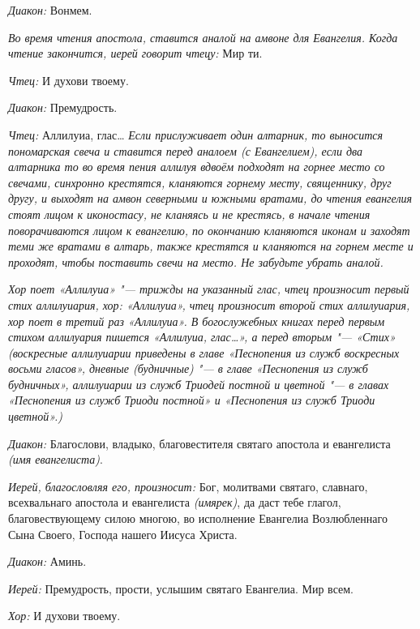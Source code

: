 \begin{mymulticols}
{\itshape Диакон:} Вонмем.


{\itshape Во время чтения апостола, ставится аналой на амвоне для Евангелия. Когда чтение закончится, иерей говорит чтецу:} Мир ти.


 {\itshape Чтец:} И духови твоему.




{\itshape Диакон:} Премудрость.

{\itshape Чтец:} Аллилуиа, глас… {\itshape Если прислуживает один алтарник, то выносится пономарская свеча и ставится перед аналоем (с Евангелием), если два алтарника то во время пения аллилуя вдвоём подходят на горнее место со свечами, синхронно крестятся, кланяются горнему месту, священнику, друг другу, и выходят на амвон северными и южными вратами, до чтения евангелия стоят лицом к иконостасу, не кланяясь и не крестясь, в начале чтения поворачиваются лицом к евангелию, по окончанию кланяются иконам и заходят теми же вратами в алтарь, также крестятся и кланяются на горнем месте и проходят, чтобы поставить свечи на место. Не забудьте убрать аналой.}


{\itshape Хор поет «Аллилуиа» "--- трижды на указанный глас, чтец произносит первый стих аллилуиария, хор: «Аллилуиа», чтец произносит второй стих аллилуиария, хор поет в третий раз «Аллилуиа». В богослужебных книгах перед первым стихом аллилуария пишется «Аллилуиа, глас…», а перед вторым "--- «Стих» (воскресные аллилуиарии приведены в главе «Песнопения из служб воскресных восьми гласов», дневные (будничные) "--- в главе «Песнопения из служб будничных», аллилуиарии из служб Триодей постной и цветной "--- в главах «Песнопения из служб Триоди постной» и «Песнопения из служб Триоди цветной».) }


{\itshape Диакон:} Благослови, владыко, благовестителя святаго апостола и евангелиста {\itshape (имя евангелиста)}.


{\itshape Иерей, благословляя его, произносит:} Бог, молитвами святаго, славнаго, всехвальнаго апостола и евангелиста {\itshape (имярек)}, да даст тебе глагол, благовествующему силою многою, во исполнение Евангелиа Возлюбленнаго Сына Своего, Господа нашего Иисуса Христа.


{\itshape Диакон:} Аминь.


{\itshape Иерей:} Премудрость, прости, услышим святаго Евангелиа. Мир всем.

{\itshape Хор:} И духови твоему.



\end{mymulticols}

